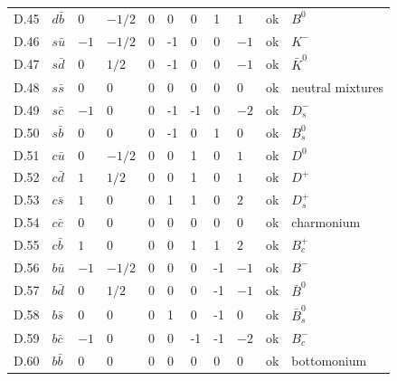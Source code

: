 {\begin{longtable}{@{}llllllllll>{\raggedright\arraybackslash}p{3.2cm}@{}}
D.45 & $d\bar{b}$ & $0$ & $-1/2$ & $0$ & 0 & 0 & 1 & $1$ & ok & $B^0$ \\
D.46 & $s\bar{u}$ & $-1$ & $-1/2$ & $0$ & -1 & 0 & 0 & $-1$ & ok & $K^-$ \\
D.47 & $s\bar{d}$ & $0$ & $1/2$ & $0$ & -1 & 0 & 0 & $-1$ & ok & $\bar K^0$ \\
D.48 & $s\bar{s}$ & $0$ & $0$ & $0$ & 0 & 0 & 0 & $0$ & ok & neutral mixtures \\
D.49 & $s\bar{c}$ & $-1$ & $0$ & $0$ & -1 & -1 & 0 & $-2$ & ok & $D_s^-$ \\
D.50 & $s\bar{b}$ & $0$ & $0$ & $0$ & -1 & 0 & 1 & $0$ & ok & $B_s^0$ \\
D.51 & $c\bar{u}$ & $0$ & $-1/2$ & $0$ & 0 & 1 & 0 & $1$ & ok & $D^0$ \\
D.52 & $c\bar{d}$ & $1$ & $1/2$ & $0$ & 0 & 1 & 0 & $1$ & ok & $D^+$ \\
D.53 & $c\bar{s}$ & $1$ & $0$ & $0$ & 1 & 1 & 0 & $2$ & ok & $D_s^+$ \\
D.54 & $c\bar{c}$ & $0$ & $0$ & $0$ & 0 & 0 & 0 & $0$ & ok & charmonium \\
D.55 & $c\bar{b}$ & $1$ & $0$ & $0$ & 0 & 1 & 1 & $2$ & ok & $B_c^+$ \\
D.56 & $b\bar{u}$ & $-1$ & $-1/2$ & $0$ & 0 & 0 & -1 & $-1$ & ok & $B^-$ \\
D.57 & $b\bar{d}$ & $0$ & $1/2$ & $0$ & 0 & 0 & -1 & $-1$ & ok & $\bar B^0$ \\
D.58 & $b\bar{s}$ & $0$ & $0$ & $0$ & 1 & 0 & -1 & $0$ & ok & $\bar B_s^0$ \\
D.59 & $b\bar{c}$ & $-1$ & $0$ & $0$ & 0 & -1 & -1 & $-2$ & ok & $B_c^-$ \\
D.60 & $b\bar{b}$ & $0$ & $0$ & $0$ & 0 & 0 & 0 & $0$ & ok & bottomonium \\
\end{longtable}}
